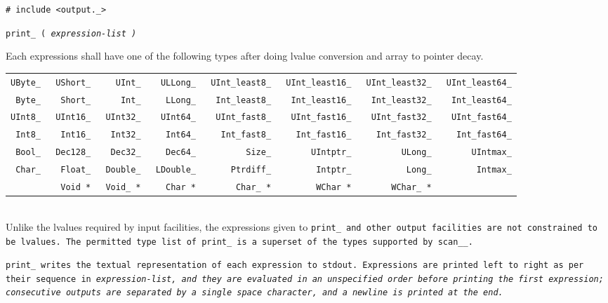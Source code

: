 
\tt{# include <output._>}

\tt{print_ (} \it{expression-list} \tt{)}


Each expressions shall have one of the following types
after doing lvalue conversion and array to pointer decay.\\

\noindent
\begin{tabular}{@{}rrrrrrrr}

\tt{UByte_} &\tt{UShort_} &  \tt{UInt_} & \tt{ULLong_} &\tt{UInt_least8_} &\tt{UInt_least16_} &\tt{UInt_least32_} &\tt{UInt_least64_}\\
 \tt{Byte_} & \tt{Short_} &   \tt{Int_} &  \tt{LLong_} & \tt{Int_least8_} & \tt{Int_least16_} & \tt{Int_least32_} & \tt{Int_least64_}\\

\tt{UInt8_} &\tt{UInt16_} &\tt{UInt32_} & \tt{UInt64_} & \tt{UInt_fast8_} & \tt{UInt_fast16_} & \tt{UInt_fast32_} & \tt{UInt_fast64_}\\
 \tt{Int8_} & \tt{Int16_} & \tt{Int32_} &  \tt{Int64_} &  \tt{Int_fast8_} &  \tt{Int_fast16_} &  \tt{Int_fast32_} &  \tt{Int_fast64_}\\

 \tt{Bool_} &\tt{Dec128_} & \tt{Dec32_} &  \tt{Dec64_} &       \tt{Size_} &     \tt{UIntptr_} &       \tt{ULong_} &     \tt{UIntmax_}\\
 \tt{Char_} & \tt{Float_} &\tt{Double_} &\tt{LDouble_} &    \tt{Ptrdiff_} &      \tt{Intptr_} &        \tt{Long_} &      \tt{Intmax_}\\

& \tt{Void *} & \tt{Void_ *} & \tt{Char *} & \tt{Char_ *} & \tt{WChar *} & \tt{WChar_ *} &

\end{tabular}\\

\note Unlike the lvalues required by input facilities, the expressions given
to \tt{print_} and other output facilities are not constrained to be lvalues.
The permitted type list of \tt{print_} is a
superset of the types supported by \tt{scan__}.


\tt{print_} writes the textual representation of each expression to \tt{stdout}.
Expressions are printed left to right as per their sequence in
\it{expression-list}, and they are evaluated in an unspecified order
before printing the first expression; consecutive outputs are separated
by a single space character, and a newline is printed at the end.

